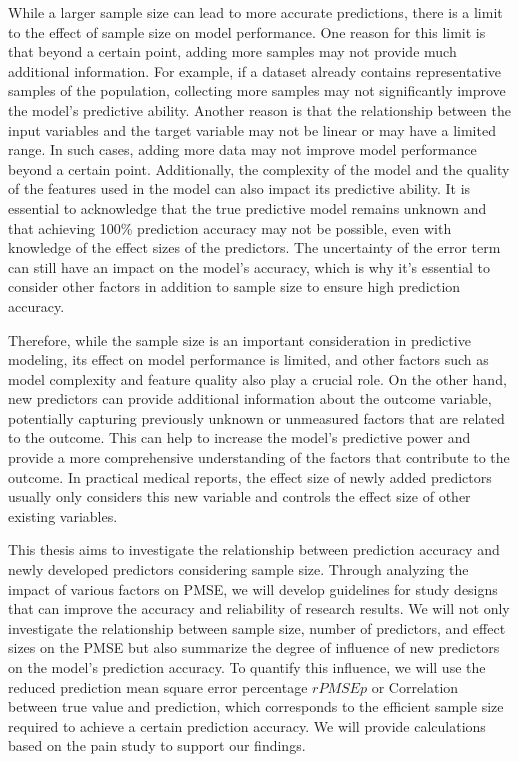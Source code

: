 While a larger sample size can lead to more accurate predictions, there is a limit to the effect of sample size on model performance. One reason for this limit is that beyond a certain point, adding more samples may not provide much additional information. For example, if a dataset already contains representative samples of the population, collecting more samples may not significantly improve the model's predictive ability. Another reason is that the relationship between the input variables and the target variable may not be linear or may have a limited range. In such cases, adding more data may not improve model performance beyond a certain point. Additionally, the complexity of the model and the quality of the features used in the model can also impact its predictive ability.  It is essential to acknowledge that the true predictive model remains unknown and that achieving 100\% prediction accuracy may not be possible, even with knowledge of the effect sizes of the predictors. The uncertainty of the error term can still have an impact on the model's accuracy, which is why it's essential to consider other factors in addition to sample size to ensure high prediction accuracy.

Therefore, while the sample size is an important consideration in predictive modeling, its effect on model performance is limited, and other factors such as model complexity and feature quality also play a crucial role. On the other hand, new predictors can provide additional information about the outcome variable, potentially capturing previously unknown or unmeasured factors that are related to the outcome. This can help to increase the model's predictive power and provide a more comprehensive understanding of the factors that contribute to the outcome. In practical medical reports, the effect size of newly added predictors usually only considers this new variable and controls the effect size of other existing variables.


This thesis aims to investigate the relationship between prediction accuracy and newly developed predictors considering sample size. Through analyzing the impact of various factors on PMSE, we will develop guidelines for study designs that can improve the accuracy and reliability of research results. We will not only investigate the relationship between sample size, number of predictors, and effect sizes on the PMSE but also summarize the degree of influence of new predictors on the model's prediction accuracy. To quantify this influence, we will use the reduced prediction mean square error percentage $rPMSEp$ or Correlation between true value and prediction, which corresponds to the efficient sample size required to achieve a certain prediction accuracy. We will provide calculations based on the pain study to support our findings.